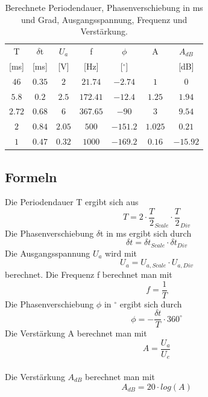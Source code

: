 \documentclass[12pt,a4paper,ngerman]{article}
\begin{document}
\begin{table}[H]
\begin{center}
\begin{tabular}{ |c|c|c|c|c|c|c| }
  \hline
    T & $\delta$t & $U_a$ & f & $\phi$ & A & $A_{dB}$\\

    [ms] & [ms] & [V] & [Hz] & [$^\circ$] & & [dB]\\
  \hline
$46$ & $0.35$ & $2$ & $21.74$ & $-2.74$ & $1$ & $0$\\
  \hline
$5.8$ & $0.2$ & $2.5$ & $172.41$ & $-12.4$ & $1.25$ & $1.94$\\
  \hline
$2.72$ & $0.68$ & $6$ & $367.65$ & $-90$ & $3$ & $9.54$\\
  \hline
$2$ & $0.84$ & $2.05$ & $500$ & $-151.2$ & $1.025$ & $0.21$\\
  \hline
$1$ & $0.47$ & $0.32$ & $1000$ & $-169.2$ & $0.16$ & $-15.92$\\
  \hline
\end{tabular}
\caption{Berechnete Periodendauer, Phasenverschiebung in ms und Grad, Ausgangsspannung, Frequenz und Verstärkung.}
\end{center}
\label{tab:1_ber}
\end{table}

\subsection{Formeln}
Die Periodendauer T ergibt sich aus
\begin{equation}
T = 2 \cdot \frac{T}{2}_{Scale} \cdot \frac{T}{2}_{Div}
\end{equation}
Die Phasenverschiebung $\delta$t in ms ergibt sich durch
\begin{equation}
\delta t = \delta t_{Scale} \cdot \delta t_{Div}
\end{equation}
Die Ausgangsspannung $U_a$ wird mit
\begin{equation}
U_a = U_{a,Scale} \cdot U_{a,Div}
\end{equation}
berechnet.
Die Frequenz f berechnet man mit
\begin{equation}
f = \frac{1}{T}
\end{equation}
Die Phasenverschiebung $\phi$ in $^\circ$ ergibt sich durch
\begin{equation}
\phi = - \frac{\delta t}{T} \cdot 360^\circ
\end{equation}
Die Verstärkung A berechnet man mit
\begin{equation}
A = \frac{U_a}{U_e}
\end{equation}\\
Die Verstärkung $A_{dB}$ berechnet man mit
\begin{equation}
A_{dB} = 20 \cdot log(A)
\end{equation}
\end{document}
